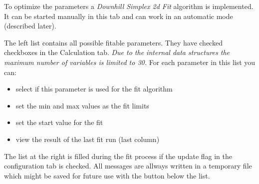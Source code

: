 \documentclass[11pt]{article} %
\begin{document}
To optimize the parameters a {\it Downhill Simplex 2d Fit} algorithm is implemented. It can be started manually in this tab and can work in an automatic mode (described later).

The left list contains all possible fitable parameters. They have checked checkboxes in the Calculation tab. {\it Due to the internal data structures the maximum number of variables is limited to 30.} For each parameter in this list you can:
\begin{itemize}\itemsep0pt
\item select if this parameter is used for the fit algorithm
\item set the min and max values as the fit limits
\item set the start value for the fit
\item view the result of the last fit run (last column)
\end{itemize}

The list at the right is filled during the fit process if the update flag in the configuration tab is checked. All messages are allways written in a temporary file which might be saved for future use with the button below the list.
\end{document}
